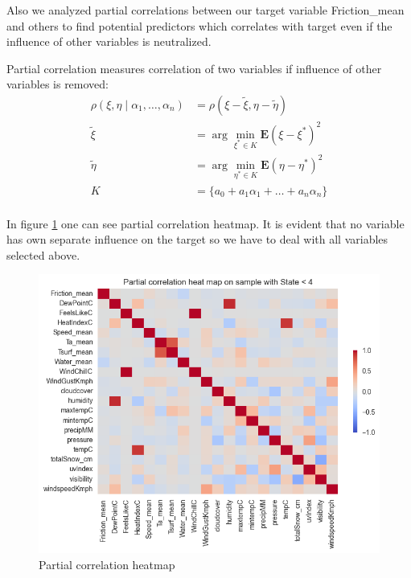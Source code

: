 \documentclass[12pt, bachelor, substylefile = algo_title.rtx]{disser}
\theoremstyle{definition}
\begin{document}
Also we analyzed partial correlations between our target variable Friction\_mean and others to find potential predictors which correlates with target even if the influence of other variables is neutralized. 

Partial correlation measures correlation of two variables if influence of other variables is removed:
\begin{align*} 
\rho(\xi, \eta \mid \alpha_1, \dots, \alpha_n) &= \rho(\xi - \widetilde{\xi}, \eta - \widetilde{\eta})\\
\widetilde{\xi} &= \arg \min_{\xi^* \in K} \mathbf{E} (\xi - \xi^*)^2 \\
\widetilde{\eta} &= \arg \min_{\eta^* \in K} \mathbf{E} (\eta - \eta^*)^2\\
K &= \{a_0 + a_1 \alpha_1 + \dots + a_n \alpha_n\}\\
\end{align*}

In figure \ref{fig: 9} one can see partial correlation heatmap. It is evident that no variable has own separate influence on the target so we have to deal with all variables selected above.

\begin{figure}[!h]
\centering
   \begin{minipage}{0.7\textwidth}
     \includegraphics[width=\linewidth]{parheatmap}
   \end{minipage}
\caption{Partial correlation heatmap}
\label{fig: 9}
\end{figure}
\end{document}
